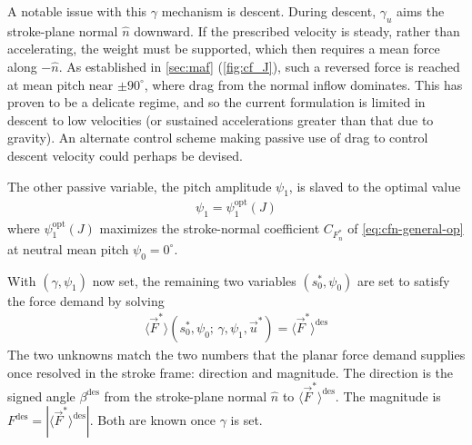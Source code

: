 \documentclass[11pt,letterpaper]{article}
\begin{document}
A notable issue with this $\gamma$ mechanism is descent.
During descent, $\gamma_u$ aims the stroke-plane normal
$\hat{n}$ downward. If the prescribed velocity is steady,
rather than accelerating, the weight must be supported,
which then requires a mean force along $-\hat{n}$.
As established in \autoref{sec:maf} (\autoref{fig:cf_J}), such a
reversed force is reached at mean pitch near $\pm 90^\circ$,
where drag from the normal inflow dominates.
This has proven to be a delicate regime, and so the current
formulation is limited in descent to low velocities (or sustained
accelerations greater than that due to gravity).
An alternate control scheme making passive use of drag to
control descent velocity could perhaps be devised.

The other passive variable, the pitch amplitude $\psi_1$,
is slaved to the optimal value
\begin{align}
    \psi_1 = \psi_1^\text{opt}(J)
    \label{eq:psi1-slave}
\end{align}
where $\psi_1^\text{opt}(J)$ maximizes the stroke-normal
coefficient $C_{F^*_n}$ of \autoref{eq:cfn-general-op} at
neutral mean pitch $\psi_0 = 0^\circ$.

With $(\gamma, \psi_1)$ now set, the remaining two variables
$(s_0^*,\psi_0)$ are set to satisfy the force demand by solving
\begin{align}
    \langle \vec{F}^* \rangle \left( s_0^*, \psi_0;\,
    \gamma, \psi_1, \vec{u}^* \right)
    = \langle \vec{F}^* \rangle^\text{des} \label{eq:trim}
\end{align}
The two unknowns match the two numbers that the planar force demand supplies
once resolved in the stroke frame: direction and magnitude.
The direction is the signed angle $\beta^\text{des}$
from the stroke-plane normal $\hat{n}$ to
$\langle \vec{F}^* \rangle^\text{des}$. The magnitude is
$F^\text{des} = | \langle \vec{F}^* \rangle^\text{des} |$.
Both are known once $\gamma$ is set.
\end{document}
